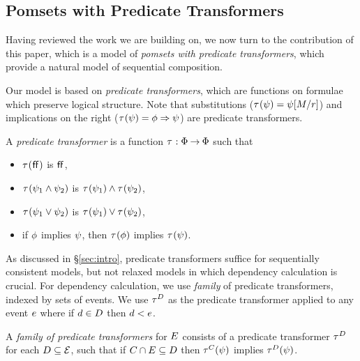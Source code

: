 \subsection{Pomsets with Predicate Transformers}

Having reviewed the work we are building on, we now turn to
the contribution of this paper, which is a model of \emph{pomsets with predicate transformers},
which provide a natural model of sequential composition.

Our model is based on \emph{predicate transformers},
which are functions on formulae which preserve logical structure.
Note that substitutions ($\aTr{}{\psi}=\psi[\aExp/\aReg]$) and implications on the right
($\aTr{}{\psi}=\phi\limplies\psi$) are predicate transformers.

\begin{definition}
  \label{def:trans}
  A \emph{predicate transformer} is a %
  function
  $\aTr{}{}:\Formulae\fun\Formulae$ such that
  \begin{itemize}
  \item $\aTr{}{\FALSE}$ is $\mkern.6mu\mathsf{ff}\mkern.6mu$,    
  \item $\aTr{}{\bForm_1\land\bForm_2}$ is $\aTr{}{\bForm_1}\land\aTr{}{\bForm_2}$,    
  \item $\aTr{}{\bForm_1\lor\bForm_2}$ is $\aTr{}{\bForm_1}\lor\aTr{}{\bForm_2}$, 
  \item if $\phi$ implies $\psi$, then $\aTr{}{\aForm}$ implies $\aTr{}{\bForm}$.
  \end{itemize}
\end{definition}

As discussed in \S\ref{sec:intro}, predicate transformers suffice for sequentially consistent
models, but not relaxed models in which dependency calculation is crucial.
For dependency calculation, we use \emph{family} of predicate transformers,
indexed by sets of events. We use $\aTr{\bEvs}{}$ as the predicate transformer
applied to any event $e$ where if $d\in D$ then $d<e$.

\begin{definition}
  \label{def:family}
  A \emph{family of predicate transformers} for $E$ consists of a
  predicate transformer $\aTr{\bEvs}{}$ for each $D\subseteq\mathcal{E}$,
  such that if $C \cap E \subseteq D$ then $\aTr{\cEvs}{\bForm}$
  implies $\aTr{\bEvs}{\bForm}$.
\end{definition}


